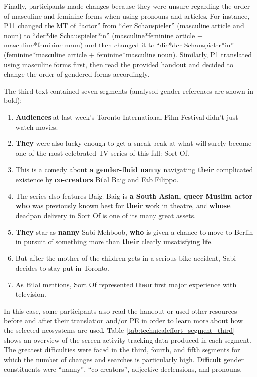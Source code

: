 Finally, participants made changes because they were unsure regarding the order of masculine and feminine forms when using pronouns and articles. For instance, P11 changed the MT of ``actor'' from ``der Schauspieler'' (masculine article and noun) to ``der*die Schauspieler*in'' (masculine*feminine article +  masculine*feminine noun) and then changed it to ``die*der Schauspieler*in'' (feminine*masculine article + feminine*masculine noun). Similarly, P1 translated using masculine forms first, then read the provided handout and decided to change the order of gendered forms accordingly. 

The third text contained seven segments (analysed gender references are shown in bold):
\begin{enumerate}
\setlength\itemsep{-0.5em}
    \item \textbf{Audiences} at last week's Toronto International Film Festival didn't just watch movies. 
    \item \textbf{They} were also lucky enough to get a sneak peak at what will surely become one of the most celebrated TV series of this fall: Sort Of. 
    \item This is a comedy about \textbf{a gender-fluid nanny} navigating \textbf{their} complicated existence by \textbf{co-creators} Bilal Baig and Fab Filippo. 
    \item The series also features Baig. Baig is \textbf{a South Asian, queer Muslim actor who} was previously known best for \textbf{their} work in theatre, and \textbf{whose} deadpan delivery in Sort Of is one of its many great assets. 
    \item \textbf{They} star as \textbf{nanny} Sabi Mehboob, \textbf{who} is given a chance to move to Berlin in pursuit of something more than \textbf{their} clearly unsatisfying life. 
    \item But after the mother of the children gets in a serious bike accident, Sabi decides to stay put in Toronto. 
    \item As Bilal mentions, Sort Of represented \textbf{their} first major experience with television.
\end{enumerate}
In this case, some participants also read the handout or used other resources before and after their translation and/or PE in order to learn more about how the selected neosystems are used. Table \ref{tab:technicaleffort_segment_third} shows an overview of the screen activity tracking data produced in each segment. The greatest difficulties were faced in the third, fourth, and fifth segments for which the number of changes and searches is particularly high. Difficult gender constituents were ``nanny'', ``co-creators'', adjective declensions, and pronouns. 

